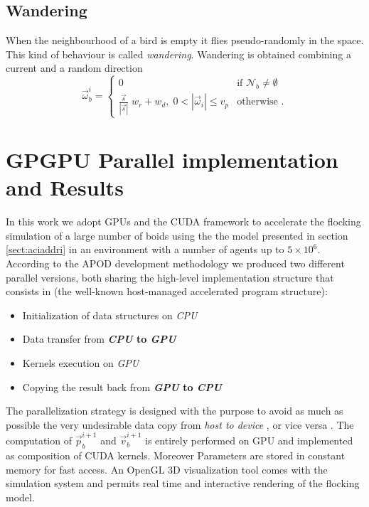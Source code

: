 \subsection{Wandering}
When the neighbourhood  of a bird is empty it flies pseudo-randomly in the space. This kind of behaviour is called \textit{wandering}. 
Wandering is obtained combining a current and a random direction 
\begin{equation*}
\vec{\omega}_b^i =  
\begin{cases} 
0 &\mbox{if } \mathcal{N}_b \neq \emptyset \\ 
\frac{\vec{s}}{|\vec{s}|}\;w_r+w_d,\; 0 < |\vec{\omega}_i| \leq v_p & \mbox{otherwise }. 
\end{cases}
\end{equation*}



\section{GPGPU Parallel implementation and Results}
\label{sect:gpuimplementation}
In this work we adopt GPUs and the CUDA framework to accelerate the flocking
simulation of a large number of boids using the the model presented in section
\ref{sect:aciaddri} in an environment with a number of agents up to $5
\times10^6$.
According to the APOD development methodology we produced two different parallel
versions, both sharing the high-level implementation structure that consists in
(the well-known host-managed accelerated program structure):
\begin{itemize}
	\item Initialization of data structures on \emph{CPU}
	\item Data transfer from \textbf{\emph{CPU} to \emph{GPU}}
	\item Kernels execution on \emph{GPU}
	\item Copying the result back from \textbf{\emph{GPU} to \emph{CPU}}
\end{itemize}
The parallelization strategy is designed with the purpose to avoid as much
as possible the very undesirable data copy from \emph{host to device}  , or vice versa\cite{CUDACBESTPRACTICE} \cite{dspataro_sciara:2017} \cite{DAmbrosio201230}.
The computation of $\vec{p}_b^{i+1}$ and $\vec{v}_b^{i+1}$ is entirely performed on GPU and implemented as composition of CUDA kernels. Moreover Parameters are stored in constant memory for fast access.
An OpenGL 3D visualization tool comes with the simulation system and permits real time and interactive 
rendering of the flocking model.

